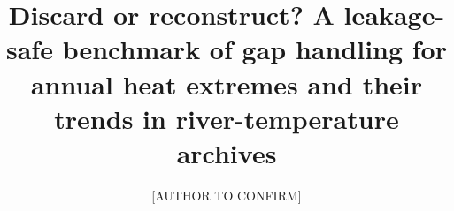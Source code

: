 \title{Discard or reconstruct? A leakage-safe benchmark of gap handling for annual heat extremes and their trends in river-temperature archives}

\author[aff1]{[AUTHOR TO CONFIRM]}
